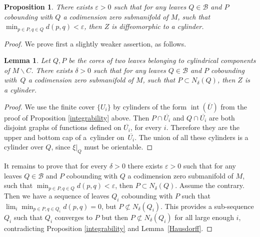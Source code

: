 \documentclass[10pt]{amsart}
\let\mathcal\mathscr
\let\moins\smallsetminus
\DeclareMathOperator{\inte}{int}
\newtheorem{lemma}[theorem]{Lemma}
\newtheorem{proposition}[theorem]{Proposition}
\theoremstyle{definition}
\theoremstyle{remark}
\numberwithin{equation}{section}
\begin{document}
\begin{proposition}\label{cylinderneighb}
There exists $\varepsilon\!>\!0$ such that for any leaves $Q\!\in\!\mathcal B$ and $P$ cobounding with $Q$ a codimension zero
submanifold of $M$, such that $\min_{p\in P, q\in Q} d(p,q) < \varepsilon$, then $Z$ is diffeomorphic to a cylinder.
\end{proposition}
\begin{proof}
We prove first a slightly weaker assertion, as follows.

\begin{lemma}
Let $Q,P$ be the cores of two leaves belonging to cylindrical components of $M\moins C$.
There exists $\delta>0$ such that for any leaves $Q\in \mathcal B$ and $P$ cobounding with~$Q$ a codimension zero
submanifold of $M$, such that $P\subset N_{\delta}(Q)$, then $Z$ is a cylinder.
\end{lemma}
\begin{proof}
We use the finite cover $\{U_i\}$ by cylinders of the form $\inte (\overline{U})$ from the proof of
Proposition \ref{integrability} above.
Then $P\cap \overline{U_i}$ and $Q\cap \overline{U_i}$ are both disjoint graphs of functions
defined on $\overline{U_i}$, for every $i$.
Therefore they are the upper and bottom cap of a~cylinder on~$\overline{U_i}$. The union of all these cylinders
is a cylinder over $Q$, since $\xi|_Q$ must be orientable.
\end{proof}

It remains to prove that for every $\delta>0$ there exists $\varepsilon>0$ such that for any leaves $Q\in \mathcal B$ and $P$ cobounding with $Q$ a codimension zero
submanifold of $M$, such that $\min_{p\in P, q\in Q} d(p,q) < \varepsilon$, then $P\subset N_{\delta}(Q)$.
Assume the contrary. Then we have a sequence of leaves $Q_i$ cobounding with $P$ such that
$\lim_i\min_{p\in P, q\in Q_i} d(p,q) =0$, but $P\not\subset N_{\delta}(Q_i)$. This provides a sub-sequence
$Q_i$ such that $Q_i$ converges to $P$ but then $P\not\subset N_{\delta}(Q_i)$ for all large enough $i$,
contradicting Proposition \ref{integrability} and Lemma~\ref{Hausdorff}.
\end{proof}
\end{document}
